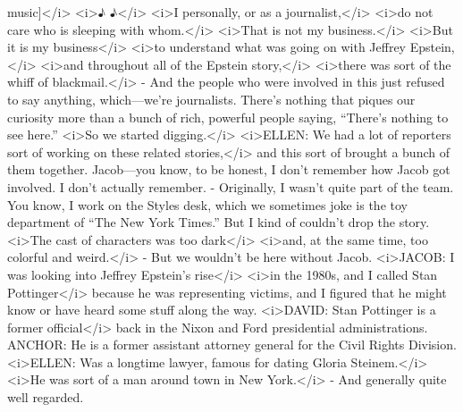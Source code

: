 \begin{itemize}
  music{]}\textless{}/i\textgreater{} \textless{}i\textgreater{}♪
  ♪\textless{}/i\textgreater{} \textless{}i\textgreater{}I personally,
  or as a journalist,\textless{}/i\textgreater{}
  \textless{}i\textgreater{}do not care who is sleeping with
  whom.\textless{}/i\textgreater{} \textless{}i\textgreater{}That is not
  my business.\textless{}/i\textgreater{} \textless{}i\textgreater{}But
  it is my business\textless{}/i\textgreater{}
  \textless{}i\textgreater{}to understand what was going on with Jeffrey
  Epstein,\textless{}/i\textgreater{} \textless{}i\textgreater{}and
  throughout all of the Epstein story,\textless{}/i\textgreater{}
  \textless{}i\textgreater{}there was sort of the whiff of
  blackmail.\textless{}/i\textgreater{} - And the people who were
  involved in this just refused to say anything, which---we're
  journalists. There's nothing that piques our curiosity more than a
  bunch of rich, powerful people saying, ``There's nothing to see
  here.'' \textless{}i\textgreater{}So we started
  digging.\textless{}/i\textgreater{} \textless{}i\textgreater{}ELLEN:
  We had a lot of reporters sort of working on these related
  stories,\textless{}/i\textgreater{} and this sort of brought a bunch
  of them together. Jacob---you know, to be honest, I don't remember how
  Jacob got involved. I don't actually remember. - Originally, I wasn't
  quite part of the team. You know, I work on the Styles desk, which we
  sometimes joke is the toy department of ``The New York Times.'' But I
  kind of couldn't drop the story. \textless{}i\textgreater{}The cast of
  characters was too dark\textless{}/i\textgreater{}
  \textless{}i\textgreater{}and, at the same time, too colorful and
  weird.\textless{}/i\textgreater{} - But we wouldn't be here without
  Jacob. \textless{}i\textgreater{}JACOB: I was looking into Jeffrey
  Epstein's rise\textless{}/i\textgreater{} \textless{}i\textgreater{}in
  the 1980s, and I called Stan Pottinger\textless{}/i\textgreater{}
  because he was representing victims, and I figured that he might know
  or have heard some stuff along the way.
  \textless{}i\textgreater{}DAVID: Stan Pottinger is a former
  official\textless{}/i\textgreater{} back in the Nixon and Ford
  presidential administrations. ANCHOR: He is a former assistant
  attorney general for the Civil Rights Division.
  \textless{}i\textgreater{}ELLEN: Was a longtime lawyer, famous for
  dating Gloria Steinem.\textless{}/i\textgreater{}
  \textless{}i\textgreater{}He was sort of a man around town in New
  York.\textless{}/i\textgreater{} - And generally quite well regarded.

\end{itemize}
